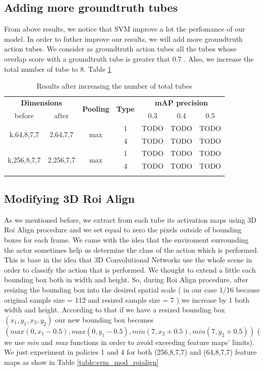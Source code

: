 \documentclass{report}
\begin{document}
\subsection{Adding more groundtruth tubes}
From above results, we notice that SVM improve a lot the perfomance of our model. In order to futher improve our results, we will
add more groundtruth action tubes. We consider as groundtruth action tubes all the tubes whose overlap score  with a groundtruth tube is
greater that 0.7 . Also, we increase the total number of tube to 8. Table \ref{table:svm_increased}

\begin{center}
\begin{longtable}{||c | c| c| c||c c c||}

  \hline
 \multicolumn{2}{||c|}{\textbf{Dimensions}} & \multirow{2}{*}{\textbf{Pooling}} &\multirow{2}{*}{ \textbf{Type}} &\multicolumn{3}{|c||}{\textbf{mAP precision}}\\

  before & after & {} & {} & 0.3 &  0.4 & 0.5 \\
  \hline   \hline

  \multirow{2}{*}{k,64,8,7,7} & \multirow{2}{*}{2,64,7,7} & \multirow{2}{*}{max}  & 1 & TODO & TODO & TODO \\
  \cline{4-7}
  {} & {} & {} & 4 & TODO & TODO & TODO   \\
  \hline   
  \multirow{2}{*}{k,256,8,7,7} & \multirow{2}{*}{2,256,7,7} & \multirow{2}{*}{max}  & 1 & TODO & TODO & TODO \\
  \cline{4-7}
  {} & {} & {} & 4 & TODO & TODO & TODO   \\
  \hline   
  \caption{Results after increasing the number of total tubes }
  \label{table:svm_increased}

\end{longtable} 
\end{center}


\subsection{Modifying 3D Roi Align}
As we mentioned before, we extract from each tube its activation maps using 3D Roi Align procedure and we set equal to zero the pixels outside
of bounding boxes for each frame. We came with the idea that the enviroment surrounding the actor sometimes help us determine the class
of the action which is performed. This is base in the idea that 3D Convolutional Networks use the whole scene in order to classify the action
that is performed. We thought to extend a little each bounding box both in width and height. So, during Roi Align procedure, after resizing
the bounding box into the desired spatial scale  ( in our case 1/16 because original sample size = 112 and resized sample size = 7 )
we increase by 1 both width and height. According to that if we have a resized bounding box $( x_1,y_1,x_2,y_2) $ our new bounding box becomes
$ (max(0,x_1-0.5),max(0,y_1-0.5),min(7,x_2+0.5),min(7,y_2+0.5)) $ ( we use \textit{ min} and \textit{max} functions in order to avoid exceeding feature maps' limits).
We just experiment in policies 1 and 4 for both (256,8,7,7) and (64,8,7,7) feature maps as show in  Table \ref{table:svm_mod_roialign}
\end{document}
